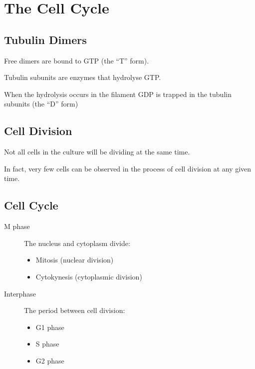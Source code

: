 \documentclass[11pt]{scrartcl}
\begin{document}
\section{The Cell Cycle}

\subsection{Tubulin Dimers}

Free dimers are bound to GTP (the ``T'' form).

Tubulin subunits are enzymes that hydrolyse GTP.

When the hydrolysis occurs in the filament GDP is trapped in the tubulin subunits (the ``D'' form)

\subsection{Cell Division}

Not all cells in the culture will be dividing at the same time.

In fact, very few cells can be observed in the process of cell
division at any given time.

\subsection{Cell Cycle}

\begin{description}

\item[M phase] 
The nucleus and cytoplasm divide:
\begin{itemize}
\item Mitosis (nuclear division)
\item Cytokynesis (cytoplasmic division)
\end{itemize}
\item[Interphase] 
The period between cell division:
\begin{itemize}
\item G1 phase
\item S phase
\item G2 phase
\end{itemize}
\end{description}
\end{document}
